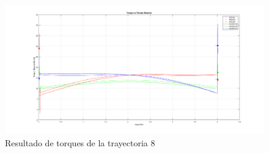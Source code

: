         \begin{figure}[h]
            \centering
            \includegraphics[width=1.0\linewidth]{Main/Chapter7/Images7/8.png}
            \caption{Resultado de torques de la trayectoria 8}
            \label{f:cap7_tray8}
        \end{figure}
        
        \newpage
        
\newpage
